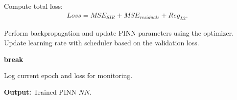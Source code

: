 \documentclass[12pt, letterpaper]{report}
\begin{document}
\begin{algorithm}
\begin{algorithmic}[1]
    \State Compute total loss:
    \begin{align*}
    Loss = MSE_{SIR} + MSE_{residuals} + Reg_{L2}.
    \end{align*}
    
    \State Perform backpropagation and update PINN parameters using the optimizer.
    \State Update learning rate with scheduler based on the validation loss.
    
        \State \textbf{break}
    \EndIf
    
        \State Log current epoch and loss for monitoring.
    \EndIf
\EndFor

\State \textbf{Output:} Trained PINN $NN$.
\end{algorithmic}
\end{algorithm}
\end{document}
